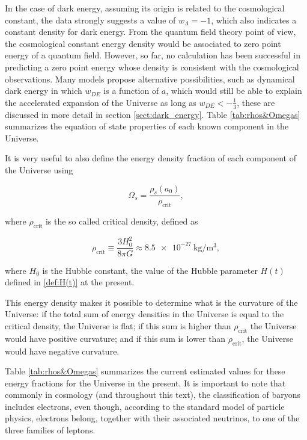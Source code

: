 \documentclass[openany,a4paper,12pt,oneside]{book}
\begin{document}
\begin{spacing}{1.5}
In the case of dark energy, assuming its origin is related to the cosmological constant, the data strongly suggests a value of $w_\Lambda=-1$, which also indicates a constant density for dark energy. From the quantum field theory point of view, the cosmological constant energy density would be associated to zero point energy of a quantum field. However, so far, no calculation has been successful in predicting a zero point energy whose density is consistent with the cosmological observations\cite{Weinberg_Lambda_1989}. Many models propose alternative possibilities, such as dynamical dark energy in which $w_{DE}$ is a function of $a$\cite{DE_models}, which would still be able to explain the accelerated expansion of the Universe as long as $w_{DE}<-\frac{1}{3}$, these are discussed in more detail in section \ref{sect:dark_energy}. Table \ref{tab:rhos&Omegas} summarizes the equation of state properties of each known component in the Universe.

It is very useful to also define the energy density fraction of each component of the Universe using

\begin{equation}\label{eq:Omega_def}
    \Omega_s=\frac{\rho_s(a_0)}{\rho_\text{crit}},
\end{equation}

\noindent where $\rho_\text{crit}$ is the so called critical density, defined as

\begin{equation}\label{def:rho_crit}
    \rho_\text{crit}\equiv \frac{3H_0^2}{8\pi G}\approx \SI{8.5e-27}{\kilogram /\meter^{3}},
\end{equation}

\noindent where $H_0$ is the Hubble constant, the value of the Hubble parameter $H(t)$ defined in \eqref{def:H(t)} at the present.

This energy density makes it possible to determine what is the curvature of the Universe: if the total sum of energy densities in the Universe is equal to the critical density, the Universe is flat; if this sum is higher than $\rho_\text{crit}$ the Universe would have positive curvature; and if this sum is lower than $\rho_\text{crit}$, the Universe would have negative curvature\cite{schutz2009first}. 

Table \ref{tab:rhos&Omegas} summarizes the current estimated values for these energy fractions for the Universe in the present. It is important to note that commonly in cosmology (and throughout this text), the classification of baryons includes electrons, even though, according to the standard model of particle physics, electrons belong, together with their associated neutrinos, to one of the three families of leptons.


\end{spacing}
\end{document}
